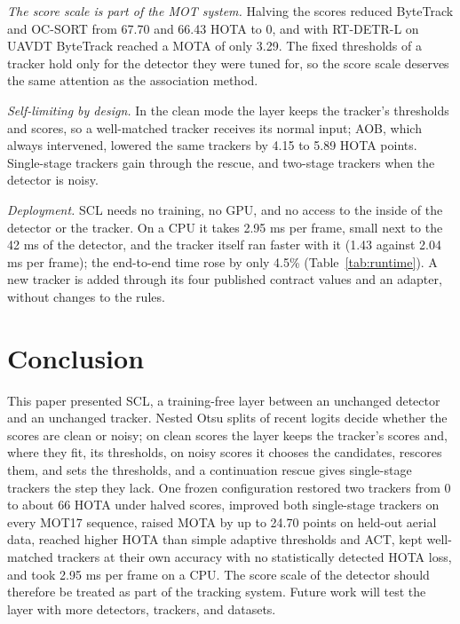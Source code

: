 \documentclass[pdflatex,sn-mathphys-num,iicol]{sn-jnl}
\newcommand{\scl}{SCL}
\newcommand{\aob}{AOB}
\begin{document}
\emph{The score scale is part of the MOT system.} Halving the scores reduced ByteTrack and OC-SORT
from 67.70 and 66.43 HOTA to 0, and with RT-DETR-L on UAVDT ByteTrack reached a MOTA of only 3.29.
The fixed thresholds of a tracker hold only for the detector they were tuned for, so the score
scale deserves the same attention as the association method.

\emph{Self-limiting by design.} In the clean mode the layer keeps the tracker's thresholds and
scores, so a well-matched tracker receives its normal input; \aob{}, which always intervened,
lowered the same trackers by 4.15 to 5.89 HOTA points. Single-stage trackers gain through the
rescue, and two-stage trackers when the detector is noisy.

\emph{Deployment.} \scl{} needs no training, no GPU, and no access to the inside of the detector or
the tracker. On a CPU it takes 2.95 ms per frame, small next to the 42 ms of the detector, and the
tracker itself ran faster with it (1.43 against 2.04 ms per frame); the end-to-end time rose by
only 4.5\% (Table~\ref{tab:runtime}). A new tracker is added through its four published contract
values and an adapter, without changes to the rules.
\section{Conclusion}\label{sec:conclusion}

This paper presented \scl{}, a training-free layer between an unchanged detector and an unchanged
tracker. Nested Otsu splits of recent logits decide whether the scores are clean or noisy; on clean
scores the layer keeps the tracker's scores and, where they fit, its thresholds, on noisy scores it chooses the candidates, rescores
them, and sets the thresholds, and a continuation rescue gives single-stage trackers the step they
lack. One frozen configuration restored two trackers from 0 to about 66 HOTA under halved scores,
improved both single-stage trackers on every MOT17 sequence, raised MOTA by up to 24.70 points on
held-out aerial data, reached higher HOTA than simple adaptive thresholds and ACT, kept well-matched
trackers at their own accuracy with no statistically detected HOTA loss, and took 2.95 ms per frame on a CPU. The score scale of the detector should therefore be treated as part of
the tracking system. Future work will test the layer with more detectors, trackers, and datasets.

\backmatter

\end{document}
